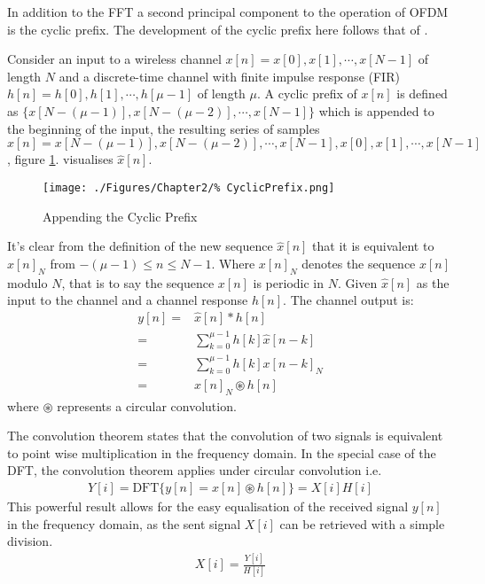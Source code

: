 In addition to the FFT a second principal component to the %
operation of OFDM is the cyclic prefix. The development of %
the cyclic prefix here follows that of \cite{Goldsmith05}.

Consider an input to a wireless channel $x[n] = x[0],x[1],\cdots,%
x[N-1]$ of length $N$ and a discrete-time channel with finite %
impulse response (FIR) $h[n] = h[0],h[1],\cdots,h[\mu-1]$ of length %
$\mu$. A cyclic prefix of $x[n]$ is defined as $\{x[N-(\mu-1)], %
x[N-(\mu-2)], \cdots, x[N-1]\}$ which is appended to the beginning %
of the input, the resulting series of samples %
$\hat{x}\left[ n \right] = x[N-(\mu-1)], %
x[N-(\mu-2)], \cdots, x[N-1], x[0], x[1], \cdots, x[N-1]$, figure %
\ref{fig:CyclicPrefix}. visualises $\hat{x}[n]$.
\begin{figure}[h!]
	\texttt{[image: ./Figures/Chapter2/\%
	CyclicPrefix.png]}
	\caption{Appending the Cyclic Prefix}
	\label{fig:CyclicPrefix}
\end{figure}
It's clear from the definition of the new sequence $\hat{x}[n]$ that %
it is equivalent to $x[n]_{N}$ from $-(\mu-1) \leq n \leq %
N-1$. Where $x[n]_{N}$ denotes the sequence $x[n]$ modulo $N$, that %
is to say the sequence $x[n]$ is periodic in $N$. Given $\hat{x}[n]$ %
as the input to the channel and a channel response $h[n]$. %
The channel output is:
\begin{align}
	y[n] =& \hat{x}[n]*h[n]\\
	     =& \sum_{k=0}^{\mu-1}h[k]\hat{x}[n-k]\\
	     =& \sum_{k=0}^{\mu-1}h[k]x[n-k]_{N}\\
	     =& x[n]_{N}\circledast h[n]
\end{align}
where $\circledast$ represents a circular convolution. %

The convolution theorem states that the convolution %
of two  signals is equivalent to point wise %
multiplication in the frequency domain\cite{MathWorldConvolution%
Theorem}. In the special case of the DFT, the convolution theorem %
applies under circular convolution i.e.
\begin{align}
	Y[i] = \text{DFT}\{y[n] = x[n]\circledast h[n]\} = X[i]H[i]	
	\label{eq:DFTConvolutionTheorem}
\end{align}
This powerful result allows for the easy equalisation of the %
received %
signal $y[n]$ in the frequency domain, as the sent signal $X[i]$ can be %
retrieved with a simple division.
\begin{align}
	X[i] = \frac{Y[i]}{H[i]}
	\label{eq:ZeroForcing}
\end{align}
